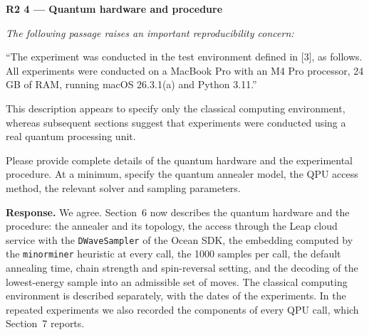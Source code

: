 \documentclass[12pt]{article}
\newenvironment{rc}[1]{\par\medskip\noindent\textbf{#1}\par\nopagebreak\noindent\itshape\renewcommand{\emph}[1]{\textbf{##1}}\ignorespaces}{\par}
\newcommand{\answer}[1]{\par\smallskip\noindent\textbf{Response.} #1\par}
\begin{document}
\begin{rc}{R2 4 --- Quantum hardware and procedure}
The following passage raises an important reproducibility concern:

``The experiment was conducted in the test environment defined in [3], as follows. All experiments were conducted on a MacBook Pro with an M4 Pro processor, 24 GB of RAM, running macOS 26.3.1(a) and Python 3.11.''

This description appears to specify only the classical computing environment, whereas subsequent sections suggest that experiments were conducted using a real quantum processing unit.

Please provide complete details of the quantum hardware and the experimental procedure. At a minimum, specify the quantum annealer model, the QPU access method, the relevant solver and sampling parameters.
\end{rc}
\answer{We agree. Section~6 now describes the quantum hardware and the procedure: the annealer and its topology, the access through the Leap cloud service with the \texttt{DWaveSampler} of the Ocean SDK, the embedding computed by the \texttt{minorminer} heuristic at every call, the 1000 samples per call, the default annealing time, chain strength and spin-reversal setting, and the decoding of the lowest-energy sample into an admissible set of moves. The classical computing environment is described separately, with the dates of the experiments. In the repeated experiments we also recorded the components of every QPU call, which Section~7 reports.}
\end{document}
